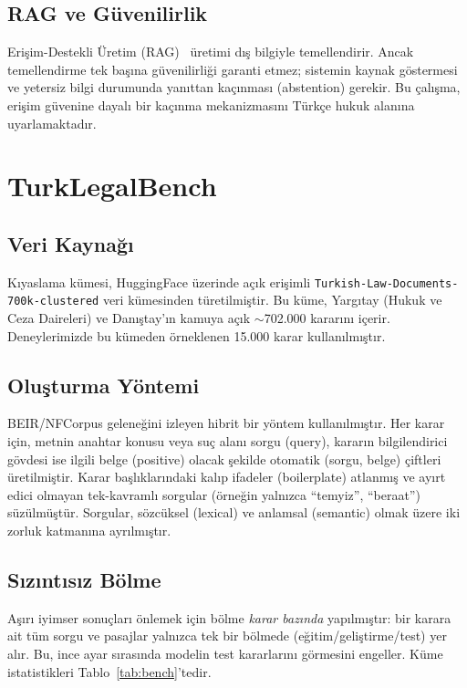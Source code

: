 \documentclass[conference]{IEEEtran}
\begin{document}
\subsection{RAG ve Güvenilirlik}
Erişim-Destekli Üretim (RAG)~\cite{lewis2020rag} üretimi dış bilgiyle temellendirir. Ancak temellendirme tek başına güvenilirliği garanti etmez; sistemin kaynak göstermesi ve yetersiz bilgi durumunda yanıttan kaçınması (abstention) gerekir. Bu çalışma, erişim güvenine dayalı bir kaçınma mekanizmasını Türkçe hukuk alanına uyarlamaktadır.

\section{TurkLegalBench}
\subsection{Veri Kaynağı}
Kıyaslama kümesi, HuggingFace üzerinde açık erişimli \texttt{Turkish-Law-Documents-700k-clustered} veri kümesinden türetilmiştir. Bu küme, Yargıtay (Hukuk ve Ceza Daireleri) ve Danıştay'ın kamuya açık $\sim$702.000 kararını içerir. Deneylerimizde bu kümeden örneklenen 15.000 karar kullanılmıştır.

\subsection{Oluşturma Yöntemi}
BEIR/NFCorpus geleneğini izleyen hibrit bir yöntem kullanılmıştır. Her karar için, metnin anahtar konusu veya suç alanı sorgu (query), kararın bilgilendirici gövdesi ise ilgili belge (positive) olacak şekilde otomatik (sorgu, belge) çiftleri üretilmiştir. Karar başlıklarındaki kalıp ifadeler (boilerplate) atlanmış ve ayırt edici olmayan tek-kavramlı sorgular (örneğin yalnızca ``temyiz'', ``beraat'') süzülmüştür. Sorgular, sözcüksel (lexical) ve anlamsal (semantic) olmak üzere iki zorluk katmanına ayrılmıştır.

\subsection{Sızıntısız Bölme}
Aşırı iyimser sonuçları önlemek için bölme \emph{karar bazında} yapılmıştır: bir karara ait tüm sorgu ve pasajlar yalnızca tek bir bölmede (eğitim/geliştirme/test) yer alır. Bu, ince ayar sırasında modelin test kararlarını görmesini engeller. Küme istatistikleri Tablo~\ref{tab:bench}'tedir.
\end{document}
